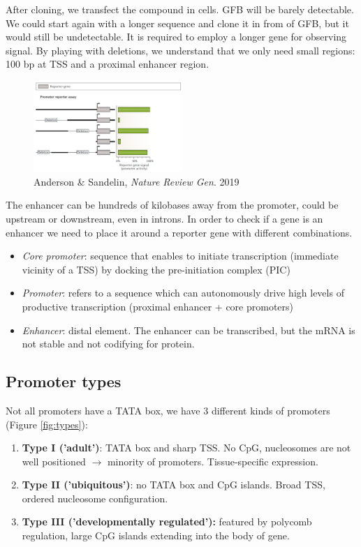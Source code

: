 After cloning, we transfect the compound in cells. GFB will be barely detectable. We could start again with a longer sequence and clone it in from of GFB, but it would still be undetectable. It is required to employ a longer gene for observing signal. By playing with deletions, we understand that we only need small regions: 100 bp at TSS and a proximal enhancer region.

\begin{figure}
\centering
\includegraphics[width=0.5\textwidth]{../_resources/Screenshot_2022-10-10_at_10-45-54.png}
\caption{Anderson \& Sandelin, \emph{Nature Review Gen}. 2019}
\end{figure}


The enhancer can be hundreds of kilobases away from the promoter, could be upstream or downstream, even in introns. In order to check if a gene is an enhancer we need to place it around a reporter gene with different combinations.

\begin{itemize}
\tightlist
\item
  \emph{Core promoter}: sequence that enables to initiate transcription (immediate vicinity of a TSS) by docking the pre-initiation complex (PIC)
\item
  \emph{Promoter}: refers to a sequence which can autonomously drive high levels of productive transcription (proximal enhancer + core promoters)
\item
  \emph{Enhancer}: distal element. The enhancer can be transcribed, but the mRNA is not stable and not codifying for protein.
\end{itemize}

\hypertarget{promoter-types}{%
\subsection{Promoter types}\label{promoter-types}}

Not all promoters have a TATA box, we have 3 different kinds of promoters (Figure  \ref{fig:types}):

\begin{enumerate}
\def\labelenumi{\arabic{enumi}.}
\tightlist
\item
  \textbf{Type I ('adult')}: TATA box and sharp TSS. No CpG, nucleosomes are not well positioned $\rightarrow$ minority of promoters. Tissue-specific expression.
\item
  \textbf{Type II ('ubiquitous')}: no TATA box and CpG islands. Broad TSS, ordered nucleosome configuration.
\item
  \textbf{Type III ('developmentally regulated'):} featured by polycomb regulation, large CpG islands extending into the body of gene.
\end{enumerate}

